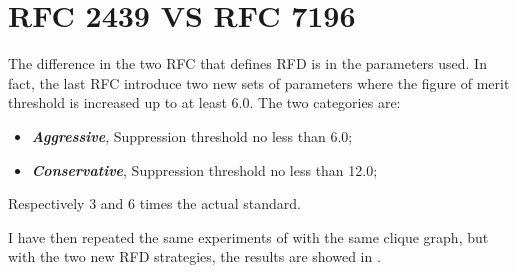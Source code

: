 
\section{RFC 2439 VS RFC 7196}
\label{sec:bgp_rfd_comparison}

The difference in the two \ac{RFC} that defines \ac{RFD} \cite{rfc2439,rfc7196}
is in the parameters used.
In fact, the last \ac{RFC} introduce two new sets of parameters where the figure
of merit threshold is increased up to at least \num{6.0}.
The two categories are:
\begin{itemize}
	\item \textit{\textbf{Aggressive}}, Suppression threshold no less than \num{6.0};
	\item \textit{\textbf{Conservative}}, Suppression threshold no less than \num{12.0};
\end{itemize}

Respectively \num{3} and \num{6} times the actual standard.

I have then repeated the same experiments of  with the same
clique graph, but with the two new \ac{RFD} strategies, the results are
showed in .

